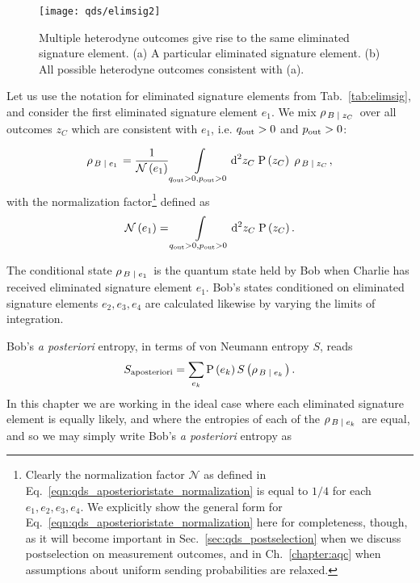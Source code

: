 \begin{figure}[htp]
\captionsetup{width=0.8\linewidth}
\centering
\texttt{[image: qds/elimsig2]}
\caption{\label{fig:qds_elimsig2} Multiple heterodyne outcomes give rise to the same eliminated signature element. (a) A particular eliminated signature element. (b) All possible heterodyne outcomes consistent with (a).}
\end{figure}



Let us use the notation for eliminated signature elements from Tab.~\ref{tab:elimsig}, and consider the first eliminated signature element $e_1$. We mix $\rho_{\left. B \; \middle| \; z_C \right.}$ over all outcomes $z_C$ which are consistent with $e_1$, i.e. $q_{\text{out}} > 0$ and $p_{\text{out}} > 0$:

\begin{equation}\label{eqn:qds_aposterioristate}
\rho_{\left. B \; \middle| \; e_1\right.} = \frac{1}{\mathcal{N}\left(e_1\right)} \int\limits_{q_{\text{out}}>0, p_{\text{out}}>0} \mathop{}\!\mathrm{d^2} z_C \; \text{P}\left(z_C\right) \; \rho_{\left. B \; \middle| \;  z_C\right.},
\end{equation}
with the normalization factor\footnote{Clearly the normalization factor $\mathcal{N}$ as defined in Eq.~\ref{eqn:qds_aposterioristate_normalization} is equal to $1/4$ for each $e_1, e_2, e_3, e_4$. We explicitly show the general form for Eq.~\ref{eqn:qds_aposterioristate_normalization} here for completeness, though, as it will become important in Sec.~\ref{sec:qds_postselection} when we discuss postselection on measurement outcomes, and in Ch.~\ref{chapter:aqc} when assumptions about uniform sending probabilities are relaxed.} defined as
\begin{equation}\label{eqn:qds_aposterioristate_normalization}
\mathcal{N}\left(e_1\right) = \int\limits_{q_{\text{out}}>0, p_{\text{out}}>0} \mathop{}\!\mathrm{d^2} z_C \; \text{P}\left(z_C\right).
\end{equation}

\noindent The conditional state $\rho_{\left. B\; \middle| \; e_1\right.}$ is the quantum state held by Bob when Charlie has received eliminated signature element $e_1$. Bob's states conditioned on eliminated signature elements $e_2, e_3, e_4$ are calculated likewise by varying the limits of integration.

Bob's \emph{a posteriori} entropy, in terms of von Neumann entropy $S$, reads
\begin{equation}
S_{\text{aposteriori}} = \sum_{e_k} \text{P}\left(e_k\right) S\left(\rho_{\left. B \; \middle| \; e_k\right.}\right).
\end{equation}
In this chapter we are working in the ideal case where each eliminated signature element is equally likely, and where the entropies of each of the $\rho_{\left. B \; \middle| \; e_k\right.}$ are equal, and so we may simply write Bob's \emph{a posteriori} entropy as

